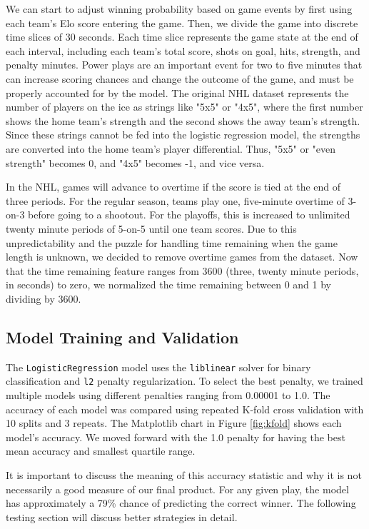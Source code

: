 \documentclass{article}
\begin{document}
We can start to adjust winning probability based on game events by first using each team's Elo score entering the game.
Then, we divide the game into discrete time slices of 30 seconds.
Each time slice represents the game state at the end of each interval, including each team's total score, shots on goal, hits, strength, and penalty minutes.
Power plays are an important event for two to five minutes that can increase scoring chances and change the outcome of the game, and must be properly accounted for by the model.
The original NHL dataset represents the number of players on the ice as strings like "5x5" or "4x5", where the first number shows the home team's strength and the second shows the away team's strength.
Since these strings cannot be fed into the logistic regression model, the strengths are converted into the home team's player differential.
Thus, "5x5" or "even strength" becomes 0, and "4x5" becomes -1, and vice versa.

In the NHL, games will advance to overtime if the score is tied at the end of three periods.
For the regular season, teams play one, five-minute overtime of 3-on-3 before going to a shootout.
For the playoffs, this is increased to unlimited twenty minute periods of 5-on-5 until one team scores.
Due to this unpredictability and the puzzle for handling time remaining when the game length is unknown, we decided to remove overtime games from the dataset.
Now that the time remaining feature ranges from 3600 (three, twenty minute periods, in seconds) to zero, we normalized the time remaining between 0 and 1 by dividing by 3600.

\subsection{Model Training and Validation}
The \texttt{LogisticRegression} model uses the \texttt{liblinear} solver for binary classification and \texttt{l2} penalty regularization.
To select the best penalty, we trained multiple models using different penalties ranging from 0.00001 to 1.0.
The accuracy of each model was compared using repeated K-fold cross validation with 10 splits and 3 repeats.
The Matplotlib chart in Figure \ref{fig:kfold} shows each model's accuracy.
We moved forward with the 1.0 penalty for having the best mean accuracy and smallest quartile range.

It is important to discuss the meaning of this accuracy statistic and why it is not necessarily a good measure of our final product.
For any given play, the model has approximately a 79\% chance of predicting the correct winner.
The following testing section will discuss better strategies in detail.
\end{document}

